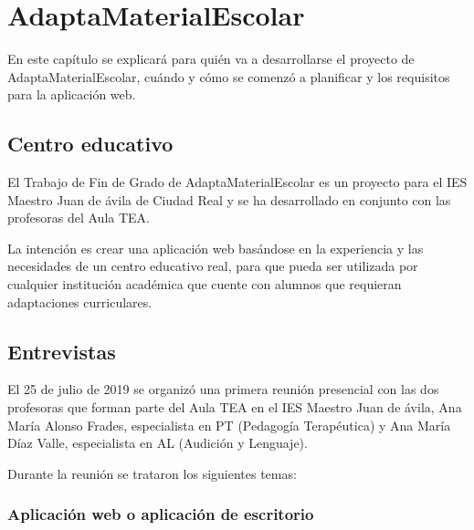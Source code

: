 %
%

\chapter{AdaptaMaterialEscolar}


\begin{resumen}
En este cap\'itulo se explicar\'a para qui\'en va a desarrollarse el proyecto de AdaptaMaterialEscolar, cu\'ando y c\'omo se comenz\'o a planificar y los requisitos para la aplicaci\'on web.
\end{resumen}


\section{Centro educativo}

    El Trabajo de Fin de Grado de AdaptaMaterialEscolar es un proyecto para el IES Maestro Juan de \'avila de Ciudad Real y se ha desarrollado en conjunto con las profesoras del Aula TEA. 

    La intenci\'on es crear una aplicaci\'on web bas\'andose en la experiencia y las necesidades de un centro educativo real, para que pueda ser utilizada por cualquier instituci\'on acad\'emica que cuente con alumnos que requieran adaptaciones curriculares.

\section{Entrevistas}
\label{cap1:sec:entrevistas}

    El 25 de julio de 2019 se organiz\'o una primera reuni\'on presencial con las dos profesoras que forman parte del Aula TEA en el IES Maestro Juan de \'avila, Ana Mar\'ia Alonso Frades, especialista en PT (Pedagog\'ia Terap\'eutica) y Ana Mar\'ia D\'iaz Valle, especialista en AL (Audici\'on y Lenguaje). 

    Durante la reuni\'on se trataron los siguientes temas:

\subsection{Aplicaci\'on web o aplicaci\'on de escritorio}

